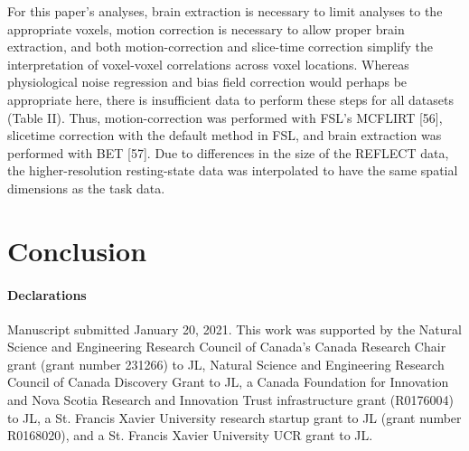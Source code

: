 For this paper’s analyses, brain extraction is necessary to limit analyses to the appropriate
voxels, motion correction is necessary to allow proper brain extraction, and both motion-correction
and slice-time correction simplify the interpretation of voxel-voxel correlations across voxel
locations. Whereas physiological noise regression and bias field correction would perhaps be
appropriate here, there is insufficient data to perform these steps for all datasets (Table II).
Thus, motion-correction was performed with FSL's MCFLIRT [56], slicetime correction with the default
method in FSL, and brain extraction was performed with BET [57]. Due to differences in the size of
the REFLECT data, the higher-resolution resting-state data was interpolated to have the same spatial
dimensions as the task data.


\section{Conclusion}



\paragraph{Declarations}
Manuscript submitted January 20, 2021. This work was supported by the  Natural Science and
Engineering Research Council of Canada's Canada Research Chair grant (grant number 231266) to JL,
Natural Science and Engineering Research Council of Canada Discovery Grant to JL, a Canada
Foundation for Innovation and Nova Scotia Research and Innovation Trust infrastructure grant
(R0176004) to JL, a St. Francis Xavier University research startup grant to JL (grant number
R0168020), and a St. Francis Xavier University UCR grant to JL.

